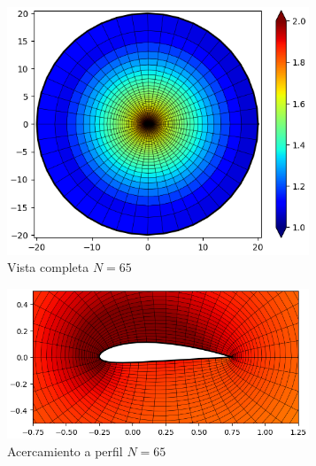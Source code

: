 \documentclass[letterpaper, openright, 12pt]{book}
\begin{document}
    \begin{figure}[htbp!]
        \centering
        \begin{subfigure}[c]{0.48\textwidth}
            \includegraphics[keepaspectratio,
                width=0.99\textwidth]{./img/naca4415_n_65_aspect_far}
            \caption{Vista completa $N=65$}
            \label{fig:naca4415_n_65_aspect_far}
        \end{subfigure}
        \hfill
        \begin{subfigure}[c]{0.48\textwidth}
            \includegraphics[keepaspectratio,
                width=0.99\textwidth]{./img/naca4415_n_65_aspect_close}
            \caption{Acercamiento a perfil $N=65$}
            \label{fig:naca4415_n65_aspect_close}
        \end{subfigure}
        \begin{subfigure}[c]{0.48\textwidth}

\end{subfigure}
\end{figure}
\end{document}
